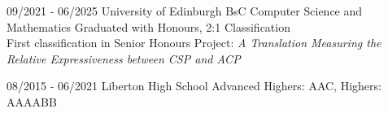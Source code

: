 \documentclass[../../cv-cs.tex]{subfiles}
\begin{document}
\cvevent
{09/2021 - 06/2025}
{University of Edinburgh}
{BsC Computer Science and Mathematics}
{Graduated with Honours, 2:1 Classification \\ First classification in Senior Honours Project: \textit{A Translation Measuring the Relative Expressiveness between CSP and ACP}}

\vfill\null

\cvevent
{08/2015 - 06/2021}
{Liberton High School}
{Advanced Highers: AAC, Highers: AAAABB}
{}
{}

\vfill\null
\end{document}
